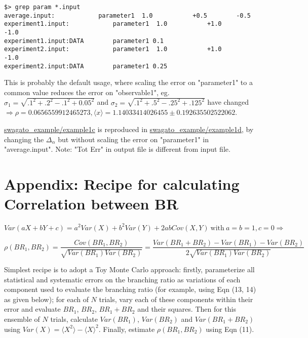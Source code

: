 \documentclass[12pt,a4paper,dvips]{article}
\begin{document}
\vspace*{-.5cm}
\begin{verbatim}
$> grep param *.input 
average.input:            parameter1  1.0           +0.5        -0.5
experiment1.input:            parameter1  1.0           +1.0        -1.0
experiment1.input:DATA        parameter1 0.1
experiment2.input:            parameter1  1.0           +1.0        -1.0
experiment2.input:DATA        parameter1 0.25
\end{verbatim}
\vspace*{-.5cm}
This is probably the default usage, where scaling the error on "parameter1" to a common value reduces the error on "observable1", eg.
$\sigma_1 =  \sqrt{ .1^2 + .2^2 - .1^2 + 0.05^2 }$ and $\sigma_2 = \sqrt{.1^2 + .5^2 -.25^2 + .125^2}$ have changed
$\Rightarrow \rho = 0.0656559912465273, \langle x \rangle = 1.14033414026455 \pm 0.192635502522062$.

\url{swagato_example/example1c} is reproduced in \url{swagato_example/example1d}, 
by changing the $\Delta_\alpha$ but without scaling the error on "parameter1" in "average.input".
Note: "Tot Err" in output file is different from input file.

\newpage
\section*{Appendix:  Recipe for calculating Correlation between BR}

$$Var(aX+bY+c) = a^2 Var(X) + b^2 Var(Y) + 2ab Cov(X,Y) \mathrm{~with~} a = b = 1, c = 0 \Rightarrow$$

\vspace*{-1cm}

\begin{equation}
\rho (BR_1, BR_2)  =  \frac{Cov(BR_1, BR_2)}{\sqrt{Var(BR_1)Var(BR_2)}}
                   = \frac{Var(BR_1 + BR_2) - Var(BR_1) - Var(BR_2)}{2\sqrt{Var(BR_1)Var(BR_2)}}
\end{equation}

\vspace*{-.5cm}
Simplest recipe is to adopt a Toy Monte Carlo approach:
firstly, parameterize  all statistical and systematic errors on  the branching ratio as variations 
of each component used to evaluate the branching ratio (for example, using Eqn (13, 14) as given below);
for each of $N$ trials, vary each of these components within their error and evaluate 
$BR_1$, $BR_2$, $BR_1+BR_2$ and their squares.
Then for this ensemble of $N$ trials, calculate $Var(BR_1)$, $Var(BR_2)$ and $Var(BR_1 + BR_2)$ 
using $Var(X) = \langle X^2 \rangle - \langle X \rangle^2$.
Finally, estimate $\rho(BR_1,BR_2)$ using Eqn (11).
\end{document}

